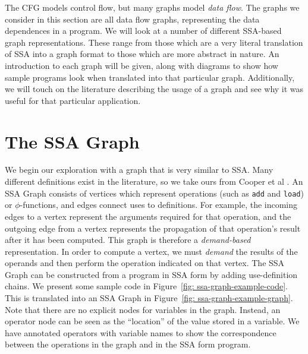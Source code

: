 The CFG models control flow, but many graphs model \textit{data flow}. The graphs we consider in this section are all data flow graphs, representing the data dependences in a program. We will look at a number of different SSA-based graph representations. These range from those which are a very literal translation of SSA into a graph format to those which are more abstract in nature. An introduction to each graph will be given, along with diagrams to show how sample programs look when translated into that particular graph. Additionally, we will touch on the literature describing the usage of a graph and see why it was useful for that particular application.

\section{The SSA Graph}

We begin our exploration with a graph that is very similar to SSA. Many different definitions exist in the literature, so we take ours from Cooper et al \cite{504710}. An SSA Graph consists of vertices which represent operations (such as \texttt{add} and \texttt{load}) or $\mathtt{\phi}$-functions, and edges connect uses to definitions. For example, the incoming edges to a vertex represent the arguments required for that operation, and the outgoing edge from a vertex represents the propagation of that operation's result after it has been computed. This graph is therefore a \textit{demand-based} representation. In order to compute a vertex, we must \textit{demand} the results of the operands and then perform the operation indicated on that vertex. The SSA Graph can be constructed from a program in SSA form by adding use-definition chains. We present some sample code in Figure~\ref{fig: ssa-graph-example-code}. This is translated into an SSA Graph in Figure~\ref{fig: ssa-graph-example-graph}. Note that there are no explicit nodes for variables in the graph. Instead, an operator node can be seen as the ``location'' of the value stored in a variable. We have annotated operators with variable names to show the correspondence between the operations in the graph and in the SSA form program.

